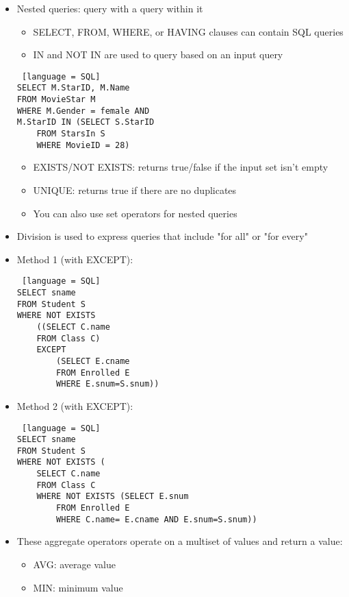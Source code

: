 \documentclass[8pt,landscape,a4paper, fleqn, dvipsnames]{extarticle}
\begin{document}
\begin{multicols*}{4}
\begin{itemize}
\begin{lstlisting} [language = SQL]
SELECT snum
FROM enrolled e
WHERE cname = Operating System Design
EXCEPT
SELECT snum
FROM enrolled e
WHERE cname = 'Database Systems'
    \end{lstlisting}
    \item Nested queries: query with a query within it
    \begin{itemize}
        \item SELECT, FROM, WHERE, or HAVING clauses can contain SQL queries
        \item IN and NOT IN are used to query based on an input query
    \end{itemize}
    \begin{lstlisting} [language = SQL]
SELECT M.StarID, M.Name
FROM MovieStar M
WHERE M.Gender = female AND
M.StarID IN (SELECT S.StarID
    FROM StarsIn S
    WHERE MovieID = 28)
    \end{lstlisting}
    \begin{itemize}
        \item EXISTS/NOT EXISTS: returns true/false if the input set isn't empty 
        \item UNIQUE: returns true if there are no duplicates
        \item You can also use set operators for nested queries
    \end{itemize}
    \item Division is used to express queries that include "for all" or "for every"
    \item Method 1 (with EXCEPT):
    \begin{lstlisting} [language = SQL]
SELECT sname
FROM Student S
WHERE NOT EXISTS
    ((SELECT C.name
    FROM Class C)
    EXCEPT
        (SELECT E.cname
        FROM Enrolled E
        WHERE E.snum=S.snum))
    \end{lstlisting}
    \item Method 2 (with EXCEPT):
    \begin{lstlisting} [language = SQL]
SELECT sname
FROM Student S
WHERE NOT EXISTS (
    SELECT C.name
    FROM Class C
    WHERE NOT EXISTS (SELECT E.snum
        FROM Enrolled E
        WHERE C.name= E.cname AND E.snum=S.snum))
    \end{lstlisting}
    \item These aggregate operators operate on a multiset of values and return a value:
    \begin{itemize}
        \item AVG: average value
        \item MIN: minimum value

\end{itemize}
\end{itemize}
\end{multicols*}
\end{document}
